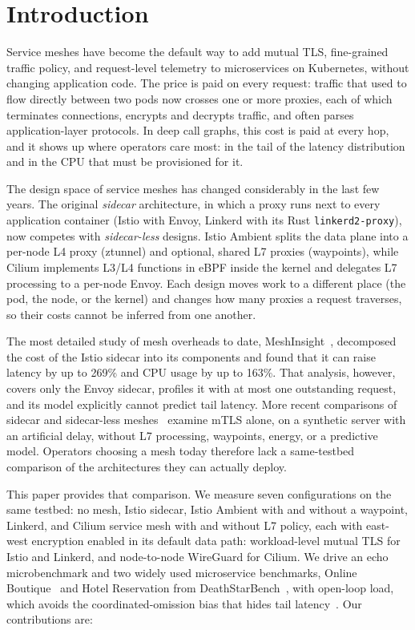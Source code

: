 \section{Introduction}
\label{sec:intro}

Service meshes have become the default way to add mutual TLS, fine-grained
traffic policy, and request-level telemetry to microservices on Kubernetes,
without changing application code. The price is paid on every request: traffic
that used to flow directly between two pods now crosses one or more proxies,
each of which terminates connections, encrypts and decrypts traffic, and often
parses application-layer protocols. In deep call graphs, this cost is paid at
every hop, and it shows up where operators care most: in the tail of the
latency distribution and in the CPU that must be provisioned for it.

The design space of service meshes has changed considerably in the last few
years. The original \emph{sidecar} architecture, in which a proxy runs next to
every application container (Istio with Envoy, Linkerd with its Rust
\texttt{linkerd2-proxy}), now competes with \emph{sidecar-less} designs. Istio
Ambient splits the data plane into a per-node L4 proxy (ztunnel) and optional,
shared L7 proxies (waypoints), while Cilium implements L3/L4 functions in eBPF
inside the kernel and delegates L7 processing to a per-node Envoy. Each design
moves work to a different place (the pod, the node, or the kernel) and changes
how many proxies a request traverses, so their costs cannot be inferred from
one another.

The most detailed study of mesh overheads to date, MeshInsight~\cite{zhu2023meshinsight},
decomposed the cost of the Istio sidecar into its components and found that it
can raise latency by up to 269\% and CPU usage by up to 163\%. That analysis,
however, covers only the Envoy sidecar, profiles it with at most one
outstanding request, and its model explicitly cannot predict tail latency. More recent comparisons of sidecar and
sidecar-less meshes~\cite{bremlerbarr2024mtls} examine mTLS alone, on a
synthetic server with an artificial delay, without L7 processing, waypoints,
energy, or a predictive model. Operators choosing a mesh today therefore lack a
same-testbed comparison of the architectures they can actually deploy.

This paper provides that comparison. We measure seven configurations on the same
testbed: no mesh, Istio sidecar, Istio Ambient with and without a waypoint,
Linkerd, and Cilium service mesh with and without L7 policy, each with east-west encryption enabled
in its default data path: workload-level mutual TLS for Istio and Linkerd,
and node-to-node WireGuard for Cilium. We drive an echo
microbenchmark and two widely used microservice benchmarks, Online
Boutique~\cite{onlineboutique} and Hotel Reservation from
DeathStarBench~\cite{gan2019deathstarbench}, with open-loop load, which avoids
the coordinated-omission bias that hides tail
latency~\cite{tene2015latency,schroeder2006open}.
Our contributions are:

